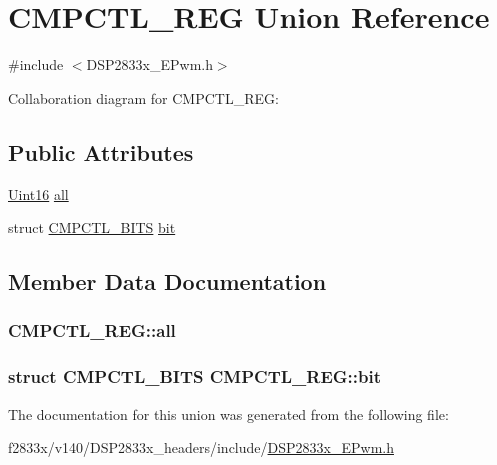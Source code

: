 \hypertarget{union_c_m_p_c_t_l___r_e_g}{}\section{C\+M\+P\+C\+T\+L\+\_\+\+R\+E\+G Union Reference}
\label{union_c_m_p_c_t_l___r_e_g}


{\ttfamily \#include $<$D\+S\+P2833x\+\_\+\+E\+Pwm.\+h$>$}



Collaboration diagram for C\+M\+P\+C\+T\+L\+\_\+\+R\+E\+G\+:
\subsection*{Public Attributes}
\begin{DoxyCompactItemize}
\item 
\hyperlink{_d_s_p2833x___device_8h_a59a9f6be4562c327cbfb4f7e8e18f08b}{Uint16} \hyperlink{union_c_m_p_c_t_l___r_e_g_a107c22728b55409f4b388976db7e1544}{all}
\item 
struct \hyperlink{struct_c_m_p_c_t_l___b_i_t_s}{C\+M\+P\+C\+T\+L\+\_\+\+B\+I\+T\+S} \hyperlink{union_c_m_p_c_t_l___r_e_g_a2708576433d3f57ab5038868cb5168ba}{bit}
\end{DoxyCompactItemize}


\subsection{Member Data Documentation}
\hypertarget{union_c_m_p_c_t_l___r_e_g_a107c22728b55409f4b388976db7e1544}{}
\subsubsection[{all}]{ C\+M\+P\+C\+T\+L\+\_\+\+R\+E\+G\+::all}\label{union_c_m_p_c_t_l___r_e_g_a107c22728b55409f4b388976db7e1544}
\hypertarget{union_c_m_p_c_t_l___r_e_g_a2708576433d3f57ab5038868cb5168ba}{}
\subsubsection[{bit}]{\setlength{\rightskip}{0pt plus 5cm}struct {\bf C\+M\+P\+C\+T\+L\+\_\+\+B\+I\+T\+S} C\+M\+P\+C\+T\+L\+\_\+\+R\+E\+G\+::bit}\label{union_c_m_p_c_t_l___r_e_g_a2708576433d3f57ab5038868cb5168ba}


The documentation for this union was generated from the following file\+:\begin{DoxyCompactItemize}
\item 
f2833x/v140/\+D\+S\+P2833x\+\_\+headers/include/\hyperlink{_d_s_p2833x___e_pwm_8h}{D\+S\+P2833x\+\_\+\+E\+Pwm.\+h}\end{DoxyCompactItemize}
